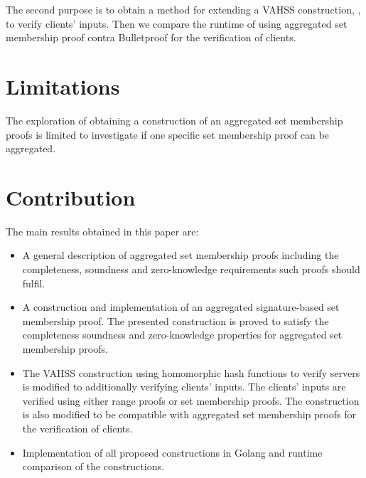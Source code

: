 The second purpose is to obtain a method for extending a VAHSS construction, \cite{SumItUp}, to verify clients' inputs. Then we compare the runtime of using aggregated set membership proof contra Bulletproof for the verification of clients.

\section*{Limitations}
The exploration of obtaining a construction of an aggregated set membership proofs is limited to investigate if one specific set membership proof can be aggregated. 




\section*{Contribution}
The main results obtained in this paper are:
\begin{itemize}
\item A general description of aggregated set membership proofs including the completeness, soundness and zero-knowledge requirements such proofs should fulfil. 

\item A construction and implementation of an aggregated signature-based set membership proof. The presented construction is proved to satisfy the completeness soundness and zero-knowledge properties for aggregated set membership proofs.

\item The VAHSS construction using homomorphic hash functions to verify servers  \cite{SumItUp} is modified to additionally verifying clients' inputs. The clients' inputs are verified using either range proofs or set membership proofs. The construction is also modified to be compatible with aggregated set membership proofs for the verification of clients.

\item Implementation of all proposed constructions in Golang and runtime comparison of the constructions.
\end{itemize}

